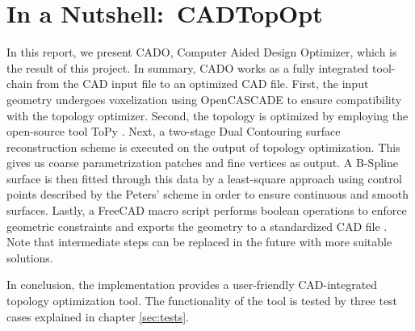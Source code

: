\section{In a Nutshell:\ \acl{CADTopOpt}}
\label{sec:nutshell}
In this report, we present CADO, Computer Aided Design Optimizer, which is the result of this project. In summary, CADO works as a fully integrated tool-chain from the CAD input file to an optimized CAD file. First, the input geometry undergoes voxelization using OpenCASCADE to ensure compatibility with the topology optimizer. Second, the topology is optimized by employing the open-source tool ToPy \cite{ToPy}.  
Next, a two-stage Dual Contouring surface reconstruction scheme is executed on the output of topology optimization. This gives us coarse parametrization patches and fine vertices as output.
A B-Spline surface is then fitted through this data by a least-square approach using control points described by the Peters' scheme \cite{peters1992constructing} in order to ensure continuous and smooth surfaces. Lastly, a FreeCAD macro script performs boolean operations to enforce geometric constraints and exports the geometry to a standardized CAD file \cite{FreeCAD}.
Note that intermediate steps can be replaced in the future with more suitable solutions. 


In conclusion, the implementation provides a user-friendly CAD-integrated topology optimization tool. The functionality of the tool is tested by three test cases explained in chapter \ref{sec:tests}.

